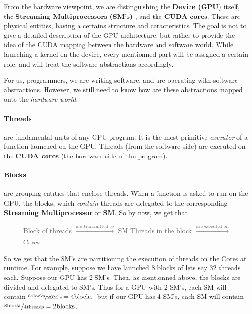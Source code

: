 From the hardware viewpoint, we are distinguishing the \textbf{Device (GPU)} itself, the \textbf{Streaming Multiprocessors (SM's)}
, and the \textbf{CUDA cores}. These are physical entities, having a certains structure and caracteristics. 
The goal is not to give a detailed description of the GPU architecture, but rather to provide the 
idea of the CUDA mapping between the hardware and software world. While launching a kernel on the device, 
every mentionned part will be assigned a certain role, and will treat the software abstractions accordingly.

For us, programmers, we are writing software, and are operating with software abstractions. However, we still need to know 
how are these abstractions mapped onto the \textit{hardware world}.

\vspace{-15pt}
\paragraph{\underline{Threads}} are fundamental units of any GPU program. It is the most primitive \textit{executor} of a function 
launched on the GPU. Threads (from the software side) are executed on the \textbf{CUDA cores} (the hardware side of the program).

\vspace{-15pt}
\paragraph{\underline{Blocks}} \label{blocks} are grouping entities that enclose threads. When a function is asked to run on the GPU, the 
blocks, which \textit{contain} threads are delegated to the corresponding \textbf{Streaming Multiprocessor} or \textbf{SM}.
So by now, we get that 

\begin{quote}
   \centering
   Block of threads $\xrightarrow[]{\text{are transmitted to}}$ SM \newline
   Threads in the block $\xrightarrow[]{\text{are executed on}}$ Cores 
\end{quote} 

So we get that the SM's are partitioning the execution of threads on the Cores at runtime. For example, suppose we have 
launched 8 blocks of lets say 32 threads each. Suppose our GPU has 2 SM's. Then, as mentionned above, 
the blocks are divided and delegated to SM's. Thus for a GPU with 2 SM's, each SM will contain 
$\nicefrac{8\text{blocks}}{2\text{SM's}} = 4 \text{blocks}$, but if our GPU has 4 SM's, 
each SM will contain $\nicefrac{8\text{blocks}}{4\text{threads}} = 2 \text{blocks}$.

